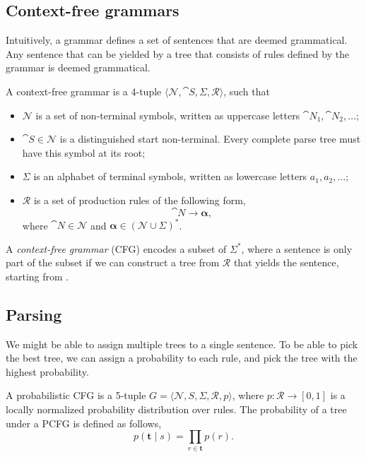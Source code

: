 \subsection{Context-free grammars}

Intuitively, a grammar defines a set of sentences that are deemed
grammatical. Any sentence that can be yielded by a tree that consists of
rules defined by the grammar is deemed grammatical.

\begin{definition}
    A context-free grammar is a 4-tuple $\langle \mathcal{N}, \cat{S},
        \Sigma,\mathcal{R} \rangle$, such that
    \begin{itemize}
        \item $\mathcal{N}$ is a set of non-terminal symbols, written as uppercase
              letters $\cat{N}_1, \cat{N}_2, \ldots$;
        \item $\cat{S} \in \mathcal{N}$ is a distinguished start non-terminal.
              Every complete parse tree must have this symbol at its root;
        \item $\Sigma$ is an alphabet of terminal symbols, written as lowercase
              letters $a_1,a_2,\ldots$;
        \item $\mathcal{R}$ is a set of production rules of the following form, \[
                  \cat{N} \to \bm{\alpha}
                  ,\]
              where $\cat{N}\in\mathcal{N}$ and $\bm{\alpha}\in (\mathcal{N} \cup
                  \Sigma)^*$.
    \end{itemize}
\end{definition}

A \textit{context-free grammar} (CFG) encodes a subset of $\Sigma^*$, where a
sentence is only part of the subset if we can construct a tree from
$\mathcal{R}$ that yields the sentence, starting from .

\subsection{Parsing}

We might be able to assign multiple trees to a single sentence. To be able to
pick the best tree, we can assign a probability to each rule, and pick the
tree with the highest probability.

\begin{definition}
    A probabilistic CFG is a 5-tuple $G=\langle \mathcal{N}, S,
        \Sigma,\mathcal{R}, p \rangle$, where $p: \mathcal{R}\to [0,1]$ is a locally
    normalized probability distribution over rules. The probability of a tree
    under a PCFG is defined as follows, \[
        p(\bm{t} \mid s) = \prod_{r\in\bm{t}} p(r)
        .\]
\end{definition}


